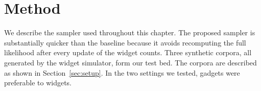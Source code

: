 \section{Method}
\label{sec:method}
We describe the sampler used throughout this chapter.
The proposed sampler is substantially quicker than the baseline because it
avoids recomputing the full likelihood after every update of the widget counts.
Three synthetic corpora, all generated by the widget simulator, form our test bed.
The corpora are described as shown in Section~\ref{sec:setup}.
In the two settings we tested, gadgets were preferable to widgets.
